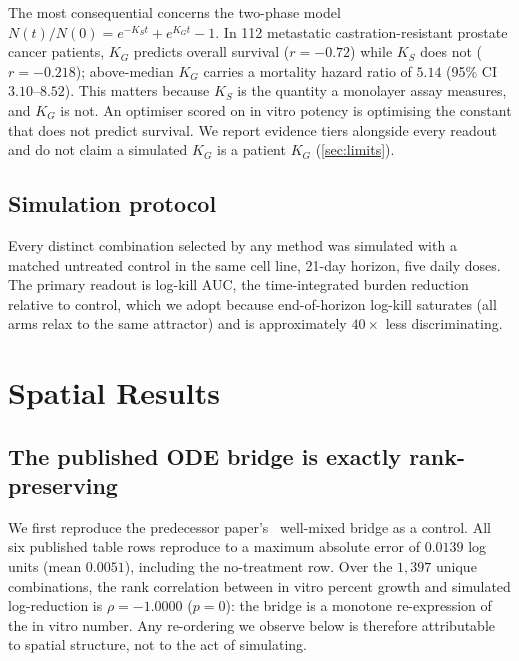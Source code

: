 \documentclass{article}
\begin{document}
The most consequential concerns the two-phase model
$N(t)/N(0) = e^{-K_S t} + e^{K_G t} - 1$. In 112 metastatic
castration-resistant prostate cancer patients, $K_G$ predicts
overall survival ($r = -0.72$) while $K_S$ does not ($r = -0.218$);
above-median $K_G$ carries a mortality hazard ratio of $5.14$ (95\% CI
$3.10$--$8.52$). This matters because $K_S$ is the quantity a
monolayer assay measures, and $K_G$ is not. An optimiser scored on in vitro
potency is optimising the constant that does not predict survival. We report
evidence tiers alongside every readout and do not claim a simulated $K_G$ is
a patient $K_G$ (\cref{sec:limits}).

\subsection{Simulation protocol}

Every distinct combination selected by any method was simulated with a
matched untreated control in the same cell line, 21-day horizon, five daily
doses. The primary readout is log-kill AUC, the time-integrated
burden reduction relative to control, which we adopt because end-of-horizon
log-kill saturates (all arms relax to the same attractor) and is
approximately $40\times$ less discriminating.









\section{Spatial Results}



\subsection{The published ODE bridge is exactly rank-preserving}
\label{sec:ode}

We first reproduce the predecessor paper's~\citep{gonehal2026savitar} well-mixed bridge as a control.
All six published table rows reproduce to a maximum absolute error of
$0.0139$ log units (mean $0.0051$), including the no-treatment row. Over the
$1{,}397$ unique combinations, the rank correlation between in vitro percent
growth and simulated log-reduction is $\rho = -1.0000$ ($p = 0$): the bridge
is a monotone re-expression of the in vitro number. Any re-ordering we
observe below is therefore attributable to spatial structure, not to the act
of simulating.
\end{document}
